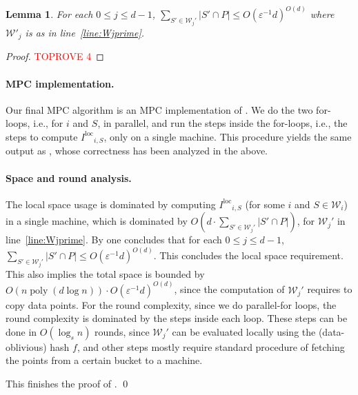 \documentclass[11pt,letterpaper]{article}
\theoremstyle{plain}
\newtheorem{lemma}[theorem]{Lemma}
\theoremstyle{definition}
\theoremstyle{remark}
\DeclareMathOperator{\poly}{poly}
\newcommand{\Iloc}{\ensuremath{I^{\mathrm{loc}}}\xspace}
\begin{document}
\begin{lemma}
\label{lemma:relevant_buckets}
    For each $0\leq j\leq d-1$, $\sum_{S'\in \mathcal{W}_{j}'} |S'\cap P|\leq O(\varepsilon^{-1}d)^{O(d)}$ where $\mathcal{W}'_{j}$ is as in  line~\ref{line:Wjprime}.  
\end{lemma}
\begin{proof}\textcolor{red}{TOPROVE 4}\end{proof}





\paragraph{MPC implementation.}
    Our final MPC algorithm is an MPC implementation of .
    We do the two for-loops, i.e., for $i$ and $S$, in parallel,
    and run the steps inside the for-loops, i.e., the steps to compute $\Iloc_{i, S}$, only on a single machine.
    This procedure yields the same output as , whose correctness has been analyzed in the above.

\paragraph{Space and round analysis.}
    The local space usage is dominated by
    computing $\Iloc_{i, S}$ (for some $i$ and $S \in \mathcal{W}_i$) in a single machine,
    which is dominated by $O(d\cdot \sum_{S'\in \mathcal{W}_j'}|S'\cap P|)$, for $\mathcal{W}_j'$ in line~\ref{line:Wjprime}. 
    By  one concludes that for each $0\leq j\leq d-1$, $\sum_{S'\in \mathcal{W}_j'}|S'\cap P| \leq O(\varepsilon^{-1}d)^{O(d)}$. 
This concludes the local space requirement.
    This also implies the total space is bounded by 
    $O(n\poly(d\log n))\cdot O(\varepsilon^{-1}d)^{O(d)}$, since the computation of $\mathcal{W}_j'$ requires to copy data points. 
    For the round complexity,
    since we do parallel-for loops, the round complexity is dominated by the steps inside each loop.
    These steps can be done in $O(\log_s n)$ rounds,
    since $\mathcal{W}_j'$ can be evaluated locally using the (data-oblivious) hash $f$,
    and other steps mostly require standard procedure of fetching the points from a certain bucket to a machine.

    This finishes the proof of . 
    \qed
    
\end{document}

